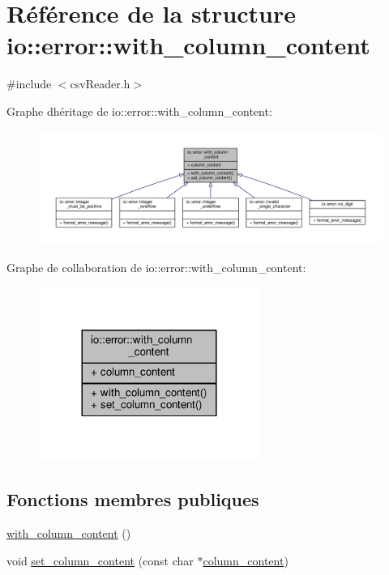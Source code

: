 \hypertarget{structio_1_1error_1_1with__column__content}{}\section{Référence de la structure io\+:\+:error\+:\+:with\+\_\+column\+\_\+content}
\label{structio_1_1error_1_1with__column__content}


{\ttfamily \#include $<$csv\+Reader.\+h$>$}



Graphe d\textquotesingle{}héritage de io\+:\+:error\+:\+:with\+\_\+column\+\_\+content\+:
\nopagebreak
\begin{figure}[H]
\begin{center}
\leavevmode
\includegraphics[width=350pt]{structio_1_1error_1_1with__column__content__inherit__graph}
\end{center}
\end{figure}


Graphe de collaboration de io\+:\+:error\+:\+:with\+\_\+column\+\_\+content\+:
\nopagebreak
\begin{figure}[H]
\begin{center}
\leavevmode
\includegraphics[width=204pt]{structio_1_1error_1_1with__column__content__coll__graph}
\end{center}
\end{figure}
\subsection*{Fonctions membres publiques}
\begin{DoxyCompactItemize}
\item 
\hyperlink{structio_1_1error_1_1with__column__content_aca754ef952be5ff4fcfe51ccb57ab66d}{with\+\_\+column\+\_\+content} ()
\item 
void \hyperlink{structio_1_1error_1_1with__column__content_ae7375310dc02425cb3cc4115b3ac8d6a}{set\+\_\+column\+\_\+content} (const char $\ast$\hyperlink{structio_1_1error_1_1with__column__content_a8587779769fbfb40155abb362137a523}{column\+\_\+content})
\end{DoxyCompactItemize}
